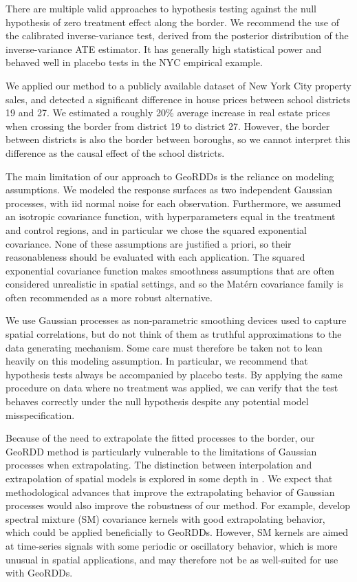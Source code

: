 \documentclass[letter]{article}
\renewcommand{\cite}[1]{\citet{#1}}
\begin{document}
There are multiple valid approaches to hypothesis testing against the null hypothesis of zero treatment effect along the border.
We recommend the use of the calibrated inverse-variance test, derived from the posterior distribution of the inverse-variance ATE estimator.
It has generally high statistical power and behaved well in placebo tests in the NYC empirical example.
    


    	We applied our method to a publicly available dataset of New York City property sales, and
detected a significant difference in house prices between school districts 19 and 27.
We estimated a roughly 20\% average increase in real estate prices when crossing the border from district 19 to district 27.
However, the border between districts is also the border between boroughs, so we cannot interpret this difference as the causal effect of the school districts.
    


    	The main limitation of our approach to GeoRDDs is the reliance on modeling assumptions.
We modeled the response surfaces as two independent Gaussian processes, with iid normal noise for each observation.
Furthermore, we assumed an isotropic covariance function, with hyperparameters equal in the treatment and control regions, and in particular we chose the squared exponential covariance.
None of these assumptions are justified a priori, so their reasonableness should be evaluated with each application.
The squared exponential covariance function makes smoothness assumptions that are often considered unrealistic in spatial settings, and so the Matérn covariance family is often recommended as a more robust alternative.

We use Gaussian processes as non-parametric smoothing devices used to capture spatial correlations, but do not think of them as truthful approximations to the data generating mechanism.
Some care must therefore be taken not to lean heavily on this modeling assumption.
In particular, we recommend that hypothesis tests always be accompanied by placebo tests.
By applying the same procedure on data where no treatment was applied, we can verify that the test behaves correctly under the null hypothesis despite any potential model misspecification.

Because of the need to extrapolate the fitted processes to the border, our GeoRDD method is particularly vulnerable to the limitations of Gaussian processes when extrapolating.
The distinction between interpolation and extrapolation of spatial models is explored in some depth in \cite{stein2012interpolation}.
We expect that methodological advances that improve the extrapolating behavior of Gaussian processes would also improve the robustness of our method.
For example, \cite{wilson2013gaussian} develop spectral mixture (SM) covariance kernels with good extrapolating behavior, which could be applied beneficially to GeoRDDs.
However, SM kernels are aimed at time-series signals with some periodic or oscillatory behavior, which is more unusual in spatial applications, and may therefore not be as well-suited for use with GeoRDDs.
    
\end{document}
